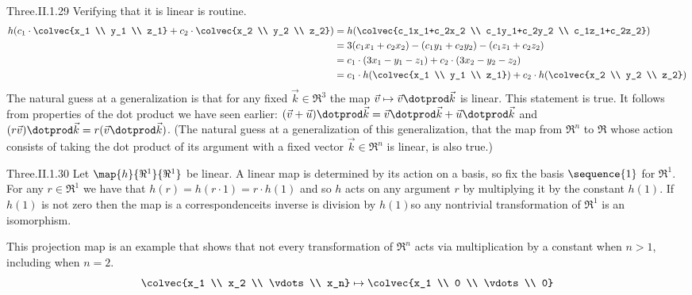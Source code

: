 \begin{ans}{Three.II.1.29}
      Verifying that it is linear is routine.
      \begin{align*}
        h(c_1\cdot \colvec{x_1 \\ y_1 \\ z_1}
          +c_2\cdot \colvec{x_2 \\ y_2 \\ z_2})
        &=h(\colvec{c_1x_1+c_2x_2 \\ c_1y_1+c_2y_2 \\ c_1z_1+c_2z_2})   \\
        &=3(c_1x_1+c_2x_2)-(c_1y_1+c_2y_2)-(c_1z_1+c_2z_2)             \\
        &=c_1\cdot (3x_1-y_1-z_1)+c_2\cdot (3x_2-y_2-z_2)             \\
        &=c_1\cdot h(\colvec{x_1 \\ y_1 \\ z_1})
          +c_2\cdot h(\colvec{x_2 \\ y_2 \\ z_2})
      \end{align*}
      The natural guess at a generalization
      is that for any fixed \( \vec{k}\in\Re^3 \)
      the map \( \vec{v}\mapsto\vec{v}\dotprod\vec{k} \) is linear.
      This statement is true.
      It follows from properties of the dot product we have seen earlier:
      \( (\vec{v}+\vec{u})\dotprod\vec{k}=\vec{v}\dotprod\vec{k}+
         \vec{u}\dotprod\vec{k} \)
      and \( (r\vec{v})\dotprod\vec{k}=r(\vec{v}\dotprod\vec{k}) \).
      (The natural guess at a generalization of this generalization,
      that the map from \( \Re^n \)
      to \( \Re \) whose action consists of taking the dot product of its
      argument with a  fixed vector \( \vec{k}\in\Re^n \) is linear,
      is also true.)
    
\end{ans}
\begin{ans}{Three.II.1.30}
      Let \( \map{h}{\Re^1}{\Re^1} \) be linear.
      A linear map is determined by its action on a basis, so fix the basis
      \( \sequence{1} \)  for \( \Re^1 \).
      For any \( r\in\Re^1 \) we have that \( h(r)=h(r\cdot 1)=r\cdot h(1) \)
      and so \( h \) acts on any argument $r$
      by multiplying it by the constant \( h(1) \).
      If \( h(1) \) is not zero then the map is a correspondence\Dash its
      inverse is division by \( h(1) \)\Dash so any nontrivial transformation
      of $\Re^1$ is an isomorphism.

      This projection map is an example that shows that not every
      transformation of \( \Re^n \) acts via multiplication by a constant
      when \( n>1 \), including when $n=2$.
      \begin{equation*}
        \colvec{x_1 \\ x_2 \\ \vdots \\ x_n}
          \mapsto\colvec{x_1 \\ 0 \\ \vdots \\ 0}
      \end{equation*}
    
\end{ans}
